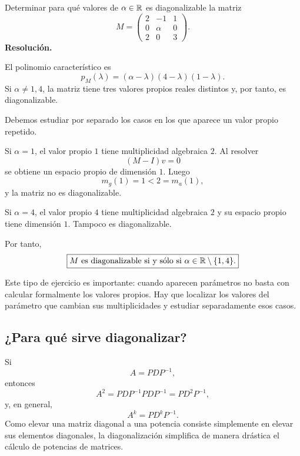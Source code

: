 \begin{solvedexercise}
Determinar para qué valores de $\alpha\in\mathbb{R}$ es diagonalizable la matriz
\[
M=\begin{pmatrix}
2&-1&1\\
0&\alpha&0\\
2&0&3
\end{pmatrix}.
\]
\tcblower
\textbf{Resolución.}\par\smallskip
El polinomio característico es
\[
p_M(\lambda)=(\alpha-\lambda)(4-\lambda)(1-\lambda).
\]
Si $\alpha\neq1,4$, la matriz tiene tres valores propios reales distintos y, por tanto, es diagonalizable.

Debemos estudiar por separado los casos en los que aparece un valor propio repetido.

Si $\alpha=1$, el valor propio $1$ tiene multiplicidad algebraica $2$. Al resolver
\[
(M-I)v=0
\]
se obtiene un espacio propio de dimensión $1$. Luego
\[
m_g(1)=1<2=m_a(1),
\]
y la matriz no es diagonalizable.

Si $\alpha=4$, el valor propio $4$ tiene multiplicidad algebraica $2$ y su espacio propio tiene dimensión $1$. Tampoco es diagonalizable.

Por tanto,
\[
\boxed{M\text{ es diagonalizable si y sólo si }\alpha\in\mathbb{R}\setminus\{1,4\}.}
\]
\end{solvedexercise}

Este tipo de ejercicio es importante: cuando aparecen parámetros no basta con calcular formalmente los valores propios. Hay que localizar los valores del parámetro que cambian sus multiplicidades y estudiar separadamente esos casos.

\subsection{¿Para qué sirve diagonalizar?}

Si
\[
A=PDP^{-1},
\]
entonces
\[
A^2=PDP^{-1}PDP^{-1}=PD^2P^{-1},
\]
y, en general,
\[
\boxed{A^k=PD^kP^{-1}.}
\]
Como elevar una matriz diagonal a una potencia consiste simplemente en elevar sus elementos diagonales, la diagonalización simplifica de manera drástica el cálculo de potencias de matrices.

